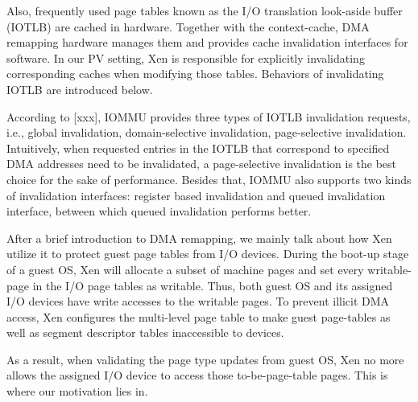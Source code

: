 Also, frequently used page tables known as the I/O translation look-aside buffer (IOTLB) are cached in hardware. Together with the context-cache, DMA remapping hardware manages them and provides cache invalidation interfaces for software. In our PV setting, Xen is responsible for explicitly invalidating corresponding caches when modifying those tables. Behaviors of invalidating IOTLB are introduced below.


According to [xxx], IOMMU provides three types of IOTLB invalidation requests, i.e., global invalidation, domain-selective invalidation, page-selective invalidation. Intuitively, when requested entries in the IOTLB that correspond to specified DMA addresses need to be invalidated, a page-selective invalidation is the best choice for the sake of performance. Besides that, IOMMU also supports two kinds of invalidation interfaces: register based invalidation and queued invalidation interface, between which queued invalidation performs better.

After a brief introduction to DMA remapping, we mainly talk about how Xen utilize it to protect guest page tables from I/O devices. During the boot-up stage of a guest OS, Xen will allocate a subset of machine pages and set every writable-page in the I/O page tables as writable. Thus, both guest OS and its assigned I/O devices have write accesses to the writable pages. To prevent illicit DMA access, Xen configures the multi-level page table to make guest page-tables as well as segment descriptor tables inaccessible to devices.

As a result, when validating the page type updates from guest OS, Xen no more allows the assigned I/O device to access those to-be-page-table pages. This is where our motivation lies in.
